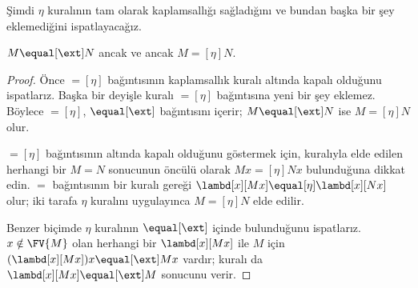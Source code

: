 \documentclass[../../../include/open-logic-section]{subfiles}
\begin{document}
Şimdi $\eta$ kuralının tam olarak kaplamsallığı sağladığını ve bundan başka
bir şey eklemediğini ispatlayacağız.

\begin{thm}
  $M \equal[\ext] N$ ancak ve ancak $M \equal[\eta] N$.
\end{thm}

\begin{proof}
  Önce $\equal[\eta]$ bağıntısının kaplamsallık kuralı altında kapalı olduğunu
  ispatlarız. Başka bir deyişle \ext{} kuralı $\equal[\eta]$ bağıntısına yeni
  bir şey eklemez. Böylece $\equal[\eta]$, $\equal[\ext]$ bağıntısını içerir;
  $M \equal[\ext] N$ ise $M \equal[\eta] N$ olur.

  $\equal[\eta]$ bağıntısının \ext{} altında kapalı olduğunu göstermek için,
  \ext{} kuralıyla elde edilen herhangi bir $M\equal N$ sonucunun öncülü
  olarak $Mx\equal[\eta]Nx$ bulunduğuna dikkat edin. $\equal$ bağıntısının
  bir kuralı gereği
  $\lambd[x][Mx]\equal[\eta]\lambd[x][Nx]$ olur; iki tarafa $\eta$ kuralını
  uygulayınca $M\equal[\eta]N$ elde edilir.

  Benzer biçimde $\eta$ kuralının $\equal[\ext]$ içinde bulunduğunu
  ispatlarız. $x\notin\FV{M}$ olan herhangi bir $\lambd[x][Mx]$ ile $M$ için
  $(\lambd[x][Mx])x\equal[\ext]Mx$ vardır; \ext{} kuralı da
  $\lambd[x][Mx]\equal[\ext]M$ sonucunu verir.
\end{proof}
\end{document}
